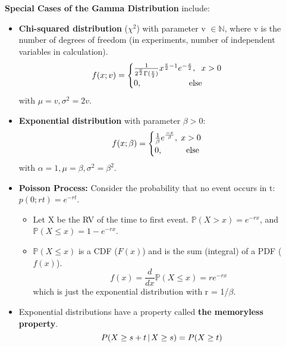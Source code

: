 \documentclass[10pt, letterpaper, twoside]{article}
\begin{document}
\begin{multicols}{2}
\textbf{Special Cases of the Gamma Distribution} include:
\begin{itemize}
    \item \textbf{Chi-squared distribution} ($\chi^2$) with parameter v $\in \mathbb{N}$, where v is the number of degrees of freedom (in experiments, number of independent variables in calculation).
    \begin{equation*}
        f(x;v) = \begin{cases}
            \frac{1}{2^{\frac{v}{2}}\Gamma(\frac{v}{2})}x^{\frac{v}{2}-1}e^{-\frac{x}{2}}, \hspace{0.2cm} x>0\\
            0, \hspace{2cm} \text{else}
        \end{cases}
    \end{equation*}
    with $\mu = v, \sigma^2 = 2v$.
    \item \textbf{Exponential distribution} with parameter $\beta > 0$:
    \begin{equation*}
        f(x;\beta) = \begin{cases}
            \frac{1}{\beta}e^{\frac{-x}{\beta}}, \hspace{0.1cm} x>0\\
            0, \hspace{1cm} \text{else}
        \end{cases}
    \end{equation*}
    with $\alpha = 1, \mu = \beta, \sigma^2 = \beta^2$.
    \item \textbf{Poisson Process:} Consider the probability that no event occurs in t: $p(0;rt) = e^{-rt}$.
    \begin{itemize}
        \item Let X be the RV of the time to first event. $\mathbb{P}(X > x) = e^{-rx}$, and $\mathbb{P}(X \leq x) = 1 - e^{-rx}$.
        \item $\mathbb{P}(X \leq x)$ is a CDF ($F(x)$) and is the sum (integral) of a PDF ($f(x)$).
        \begin{equation*}
            f(x) = \frac{d}{dx}\mathbb{P}(X\leq x) = re^{-rx}
        \end{equation*}
        \noindent which is just the exponential distribution with r = 1/$\beta$.
    \end{itemize}
    \item Exponential distributions have a property called \textbf{the memoryless property}.
    \begin{equation*}
        P(X \geq s+t\hspace{0.05cm}|\hspace{0.05 cm} X \geq s) = P(X\geq t)
    \end{equation*}
\end{itemize}


\end{multicols}
\end{document}
